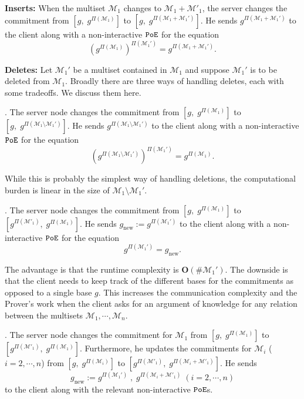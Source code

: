 \documentclass[11pt, lettersize, notitlepage, leqno, footskip=0.6cm]{article}
\newcommand{\mc}{\mathcal}
\newcommand{\mbf}{\mathbf}
\newcommand{\mr}{\mathrm}
\newcommand{\sm}{\setminus}
\newcommand{\vs}{\vspace{-0.15cm}}
\newcommand{\noin}{\noindent}
\numberwithin{equation}{section}
\begin{document}
\noin \textbf{Inserts:} When the multiset $\mc{M}_1$ changes to $\mc{M}_1+\mc{M}'_1$, the server changes the commitment from $[g,\; g^{\Pi(\mc{M}_1)}]$ to $[g,\;g^{\Pi(\mc{M}_1+\mc{M}_1')}]$. He sends $g^{\Pi(\mc{M}_1+\mc{M}_1')}$ to the client along with a non-interactive $\tt{PoE}$ for the equation \vs $$(g^{\Pi(\mc{M}_1)})^{\Pi(\mc{M}_1')} =   g^{\Pi(\mc{M}_1+\mc{M}_1')}.$$  

\noin \textbf{Deletes:} Let $\mc{M}_1'$ be a multiset contained in $\mc{M}_1$ and suppose $\mc{M}_1'$ is to be deleted from $\mc{M}_1$. Broadly there are three ways of handling deletes, each with some tradeoffs. We discuss them here. \vspace{0.1cm}

\noin 1. The server node changes the commitment from $[g,\; g^{\Pi(\mc{M}_1)}]$ to $[g,\;g^{\Pi(\mc{M}_1\sm\mc{M}_1')}]$. He sends $g^{\Pi(\mc{M}_1\sm\mc{M}_1')}$ to the client along with a non-interactive $\tt{PoE}$ for the equation \vs $$(g^{\Pi(\mc{M}_1\sm\mc{M}_1')})^{\Pi(\mc{M}_1')} =   g^{\Pi(\mc{M}_1)}.$$

While this is probably the simplest way of handling deletions, the computational burden is linear in the size of $\mc{M}_1\sm\mc{M}_1'$.
\vspace{0.1cm}

\noin 2. The server node changes the commitment from $[g,\; g^{\Pi(\mc{M}_1)}]$ to $[g^{\Pi(\mc{M}'_1)},\; g^{\Pi(\mc{M}_1)}]$. He sends $g_{\mr{new}}:= g^{\Pi(\mc{M}_1')}$ to the client along with a non-interactive $\tt{PoE}$ for the equation \vs $$g^{\Pi(\mc{M}_1')} =   g_{\mr{new}}.$$

The advantage is that the runtime complexity is $\mbf{O}(\#\mc{M}_1')$. The downside is that the client needs to keep track of the different bases for the commitments as opposed to a single base $g$. This increases the communication complexity and the Prover's work when the client asks for an argument of knowledge for any relation between the multisets $\mc{M}_1,\cdots,\mc{M}_n$. 

\vspace{0.1cm}

\noin 3. The server node changes the commitment for $\mc{M}_1$ from $[g,\; g^{\Pi(\mc{M}_1)}]$ to\\ $[g^{\Pi(\mc{M}'_1)},\; g^{\Pi(\mc{M}_1)}]$. Furthermore, he updates the commitments for $\mc{M}_i$ ($i=2,\cdots,n$) from $[g,\; g^{\Pi(\mc{M}_i)}]$ to $[g^{\Pi(\mc{M}'_1)},\; g^{\Pi(\mc{M}_i+\mc{M}'_1)}]$. He sends \vs $$g_{\mr{new}}:= g^{\Pi(\mc{M}_1')}\;,\;g^{\Pi(\mc{M}_i+\mc{M}'_1)}\;(i=2,\cdots,n)$$ to the client along with the relevant non-interactive $\tt{PoE}$s.
\end{document}
